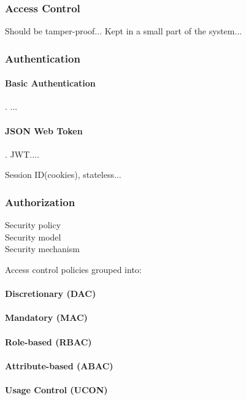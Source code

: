 \documentclass[12pt]{article}
\begin{document}
\subsubsection{Access Control}

Should be tamper-proof... Kept in a small part of the system... 
\subsubsection{Authentication}

\paragraph{Basic Authentication}. ...

\paragraph{JSON Web Token}. JWT....

Session ID(cookies), stateless...

\subsubsection{Authorization}

\begin{description}
\item[Security policy]
\item[Security model]
\item[Security mechanism]
\end{description}

Access control policies grouped into:
\paragraph{Discretionary (DAC)}
\paragraph{Mandatory (MAC)}
\paragraph{Role-based (RBAC)}
\paragraph{Attribute-based (ABAC)}
\paragraph{Usage Control (UCON)}
\end{document}
